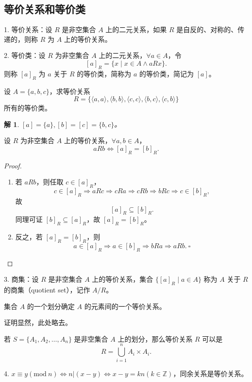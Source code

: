 \documentclass[normal,cyan]{elegantnote}
\newtheorem{solve}{解}
\newcommand{\QED}{\square}
\begin{document}
\subsection{等价关系和等价类}
1. 等价关系：设 $R$ 是非空集合 $A$ 上的二元关系，如果 $R$ 是自反的、对称的、传递的，则称 $R$ 为 $A$ 上的{\color{red}等价关系}。

2. 等价类：设 $R$ 为非空集合 $A$ 上的二元关系，$\forall a \in A$，令 $$[a]_R = \{x \mid x \in A \wedge aRx\}.$$则称 $[a]_R$ 为 $a$ 关于 $R$ 的{\color{red}等价类}，简称为 $a$ 的等价类，简记为 $[a]$。
\begin{example}
    设 $A = \{a, b, c\}$，求等价关系 $$R=\{\langle a, a\rangle,\langle b, b\rangle,\langle c, c\rangle,\langle b, c\rangle,\langle c, b\rangle\}$$所有的等价类。
\end{example}
\begin{solve}
    $[a] = \{a\}, [b] = [c] = \{b, c\}$。
\end{solve}
\begin{theorem}
    设 $R$ 为非空集合 $A$ 上的等价关系，$\forall a, b \in A$，$$aRb \Longleftrightarrow [a]_R = [b]_R.$$
\end{theorem}
\begin{proof}
    \begin{enumerate}
        \item 若 $aRb$，则任取 $c \in [a]_R$，$$c \in[a]_{R} \Rightarrow a R c \Rightarrow c R a \Rightarrow c R b \Rightarrow b R c \Rightarrow c \in[b]_{R},$$故 $$[a]_R \subseteq [b]_R.$$
        同理可证 $[b]_R \subseteq [a]_R$，故 $[a]_R = [b]_R$。
        \item 反之，若 $[a]_R = [b]_R$，则 $$a \in [a]_R \Longrightarrow a \in [b]_R \Longrightarrow bRa \Longrightarrow aRb.\ \QED$$
    \end{enumerate}
\end{proof}
3. 商集：设 $R$ 是非空集合 $A$ 上的等价关系，集合 $\{[a]_R \mid a \in A\}$ 称为 $A$ 关于 $R$ 的{\color{red}商集}（quotient set），记作 $A / R$。
\begin{theorem}
    集合 $A$ 的一个划分确定 $A$ 的元素间的一个等价关系。
\end{theorem}
证明显然，此处略去。
\begin{theorem}
    若 $S = \{A_1, A_2, \dots, A_n\}$ 是非空集合 $A$ 上的划分，那么等价关系 $R$ 可以是 $$R = \bigcup\limits_{i = 1}^n A_i \times A_i.$$
\end{theorem}
4. $x \equiv y(\mathrm{mod}\ n) \Longleftrightarrow n | (x - y) \Longleftrightarrow x - y = kn(k \in \mathbb{Z})$，同余关系是等价关系。
\end{document}
